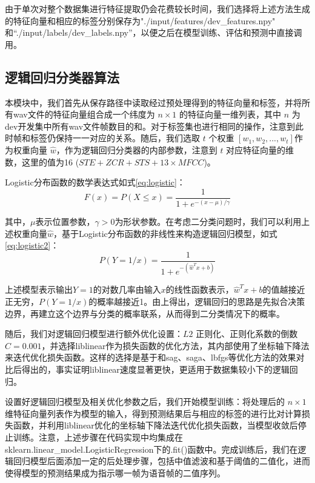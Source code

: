 \documentclass[a4paper]{article}
\begin{document}
由于单次对整个数据集进行特征提取仍会花费较长时间，我们选择将上述方法生成的特征向量和相应的标签分别保存为"./input/features/dev\_features.npy" 和“./input/labels/dev\_labels.npy”，以便之后在模型训练、评估和预测中直接调用。

\subsection{逻辑回归分类器算法}

本模块中，我们首先从保存路径中读取经过预处理得到的特征向量和标签，并将所有wav文件的特征向量组合成一个纬度为 $n \times 1$ 的特征向量一维列表，其中 $n$ 为dev开发集中所有wav文件帧数目的和。对于标签集也进行相同的操作，注意到此时帧和标签仍保持一一对应的关系。随后，我们选取 $t$ 个权重 $[w_1, w_2, ..., w_t]$作为权重向量 $\hat w$，作为逻辑回归分类器的内部参数，注意到 $t$ 对应特征向量的维数，这里的值为16 ($STE + ZCR + STS + 13 \times MFCC$)。

Logistic分布函数的数学表达式如式\ref{eq:logistic}：
\begin{equation}
  F(x) = P(X \leq x) = \frac{1}{1 + e^{-(x-\mu)/\gamma}}
  \label{eq:logistic}
\end{equation}

其中，$\mu$表示位置参数，$\gamma > 0$为形状参数。在考虑二分类问题时，我们可以利用上述权重向量$\hat w$，基于Logistic分布函数的非线性来构造逻辑回归模型，如式\ref{eq:logistic2}：
\begin{equation}
 P(Y=1/x) = \frac{1}{1 + e^{-(\hat w^Tx+b)}}
  \label{eq:logistic2}
\end{equation}

上述模型表示输出$Y=1$的对数几率由输入$x$的线性函数表示，$\hat w^Tx+b$的值越接近正无穷，$P(Y=1/x)$的概率越接近1。由上得出，逻辑回归的思路是先拟合决策边界，再建立这个边界与分类的概率联系，从而得到二分类情况下的概率。

随后，我们对逻辑回归模型进行额外优化设置：$L2$ 正则化、正则化系数的倒数 $C=0.001$，并选择liblinear作为损失函数的优化方法，其内部使用了坐标轴下降法来迭代优化损失函数。这样的选择是基于和sag、saga、lbfgs等优化方法的效果对比后得出的，事实证明liblinear速度显著更快，更适用于数据集较小下的逻辑回归。

设置好逻辑回归模型及相关优化参数之后，我们开始模型训练：将处理后的 $n \times 1$维特征向量列表作为模型的输入，得到预测结果后与相应的标签的进行比对计算损失函数，并利用liblinear优化的坐标轴下降法迭代优化损失函数，当模型收敛后停止训练。注意，上述步骤在代码实现中均集成在sklearn.linear\_model.LogisticRegression下的.fit()函数中。完成训练后，我们在逻辑回归模型后面添加一定的后处理步骤，包括中值滤波和基于阈值的二值化，进而使得模型的预测结果成为指示哪一帧为语音帧的二值序列。
\end{document}
